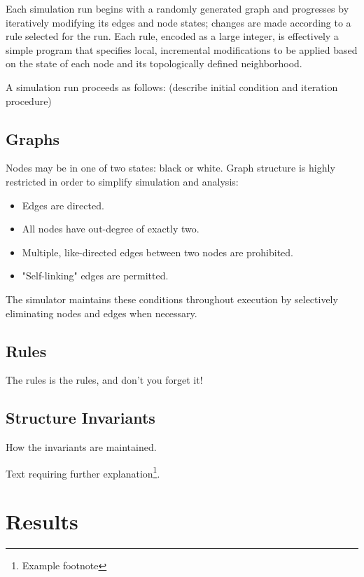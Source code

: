 \documentclass[twoside,twocolumn]{article}
\begin{document}
Each simulation run begins with a randomly generated graph and progresses by
iteratively modifying its edges and node states; changes are made according to a rule selected
for the run. Each rule, encoded as a large integer, is effectively
a simple program  that specifies local, incremental modifications to be applied based on the state
of each node and its topologically defined neighborhood.

A simulation run proceeds as follows: (describe initial condition and iteration procedure)

\subsection{Graphs}

Nodes may be in one of two states: black or white.
Graph structure is highly restricted in order to simplify simulation and analysis:

\begin{itemize}
\item Edges are directed.
\item All nodes have out-degree of exactly two.
\item Multiple, like-directed edges between two nodes are prohibited.
\item "Self-linking" edges are permitted.
\end{itemize}

The simulator maintains these conditions throughout execution by selectively eliminating
nodes and edges when necessary.

\subsection{Rules}

The rules is the rules, and don't you forget it!

\subsection{Structure Invariants}

How the invariants are maintained.

Text requiring further explanation\footnote{Example footnote}.


\section{Results}
\end{document}
